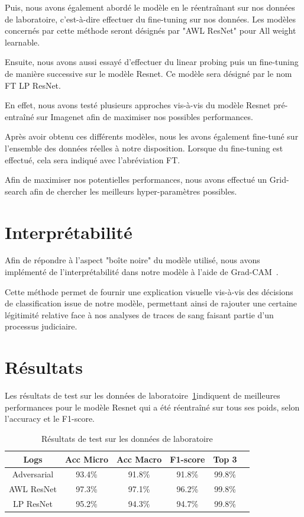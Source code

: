 \documentclass[a4paper]{article}
\begin{document}
Puis, nous avons également abordé le modèle en le réentraînant sur nos données de laboratoire, c'est-à-dire effectuer du fine-tuning sur nos données. Les modèles concernés par cette méthode seront désignés par "AWL ResNet" pour All weight learnable.

Ensuite, nous avons aussi essayé d'effectuer du linear probing puis un fine-tuning de manière successive sur le modèle Resnet. Ce modèle sera désigné par le nom FT LP ResNet. 

En effet, nous avons testé plusieurs approches vis-à-vis du modèle Resnet pré-entraîné sur Imagenet afin de maximiser nos possibles performances. 

Après avoir obtenu ces différents modèles, nous les avons également fine-tuné sur l'ensemble des données réelles à notre disposition. Lorsque du fine-tuning est effectué, cela sera indiqué avec l'abréviation FT. 


Afin de maximiser nos potentielles performances, nous avons effectué un Grid-search afin de chercher les meilleurs hyper-paramètres possibles. 

\section{Interprétabilité}

Afin de répondre à l'aspect "boîte noire" du modèle utilisé, nous avons implémenté de l'interprétabilité dans notre modèle à l'aide de Grad-CAM~\cite{DBLP:journals/corr/SelvarajuDVCPB16}. 

Cette méthode permet de fournir une explication visuelle vis-à-vis des décisions de classification issue de notre modèle, permettant ainsi de rajouter une certaine légitimité relative face à nos analyses de traces de sang faisant partie d'un processus judiciaire. 

\section{Résultats}

Les résultats de test sur les données de laboratoire~\ref{tab:results_lab}indiquent de meilleures performances pour le modèle Resnet qui a été réentraîné sur tous ses poids, selon l'accuracy et le F1-score. 

\begin{table}[H]
  \centering
  \caption{Résultats de test sur les données de laboratoire}
    \begin{tabular}{|c|c|c|c|c|c|}
    \toprule
    Logs & Acc Micro & Acc Macro & F1-score & Top 3 \\
    \midrule
    Adversarial & 93.4\% & 91.8\% & 91.8\% & 99.8\% \\
    AWL ResNet & 97.3\% & 97.1\% & 96.2\% & 99.8\% \\
    LP ResNet & 95.2\% & 94.3\% & 94.7\% & 99.8\% \\
    \bottomrule
    \end{tabular}
  \label{tab:results_lab}
\end{table}
\end{document}
